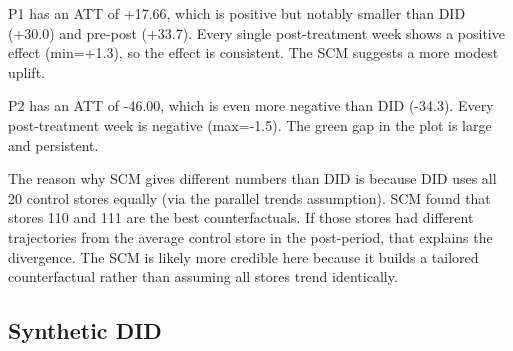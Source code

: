 \documentclass[10pt]{article}
\begin{document}
P1 has an ATT of +17.66, which is positive but notably smaller than DID (+30.0) and pre-post (+33.7). Every single post-treatment week shows a positive effect (min=+1.3), so the effect is consistent. The SCM suggests a more modest uplift. 

P2 has an ATT of -46.00, which is even more negative than DID (-34.3). Every post-treatment week is negative (max=-1.5). The green gap in the plot is large and persistent. 

The reason why SCM gives different numbers than DID is because DID uses all 20 control stores equally (via the parallel trends assumption). SCM found that stores 110 and 111 are the best counterfactuals. If those stores had different trajectories from the average control store in the post-period, that explains the divergence. The SCM is likely more credible here because it builds a tailored counterfactual rather than assuming all stores trend identically. 

\subsection{Synthetic DID}
\end{document}
